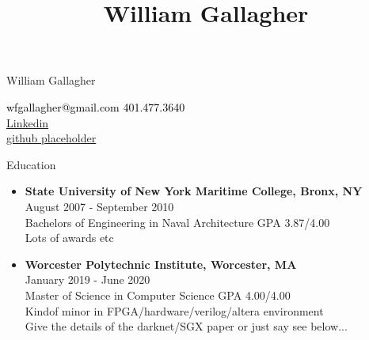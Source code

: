 \documentclass[10pt,a4paper]{article}
\title{William Gallagher}
\begin{document}
{\selectfont

\begin{tcolorbox}
  \begin{minipage}{.5\textwidth}
    \huge{William Gallagher}
  \end{minipage}
  \begin{minipage}{.5\textwidth}
      \begin{center}
        \begin{flushright}
          {\textcolor{black}
            {
              {\selectfont
                wfgallagher@gmail.com  401.477.3640\\
                \href{https://www.linkedin.com/in/william-gallagher-705199170}{Linkedin} \\
                \href{https://www.github.com}{github placeholder} \\
              }
            }
          }
        \end{flushright}
      \end{center}
  \end{minipage}
\end{tcolorbox}

\begin{tcolorbox}

  {\selectfont
    \begin{center}
      \LARGE{Education}
    \end{center}
  }

  \tcblower

  \begin{itemize}
  \item
    {
      \textbf{State University of New York Maritime College, Bronx, NY} \\
      August 2007 - September 2010 \\
      Bachelors of Engineering in Naval Architecture GPA 3.87/4.00 \\
      Lots of awards etc
    }
  \item
    {
      \textbf{Worcester Polytechnic Institute, Worcester, MA} \\
      January 2019 - June 2020 \\
      Master of Science in Computer Science GPA 4.00/4.00 \\
      Kindof minor in FPGA/hardware/verilog/altera environment \\
      Give the details of the darknet/SGX paper or just say see below...
    }
  \end{itemize}
\end{tcolorbox}

}
\end{document}
